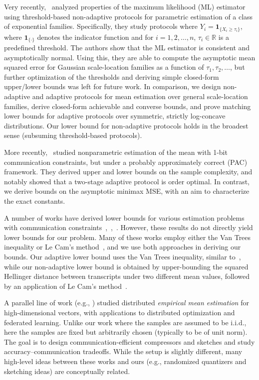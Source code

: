 \documentclass[10pt]{article} %
\newcommand{\iid}{\text{i.i.d.}}
\theoremstyle{plain}
\theoremstyle{definition}
\theoremstyle{remark}
\newcommand{\bR}{\mathbb R}
\begin{document}
Very recently,~\citep{shah2025generalized} analyzed properties of the maximum likelihood (ML) estimator using threshold-based non-adaptive protocols for parametric estimation of a class of exponential families.  Specifically, they study protocols where $Y_i=\boldsymbol{1}_{\{X_i\geq \tau_i\}}$, where $\boldsymbol{1}_{\{\cdot\}}$ denotes the indicator function and for $i=1,2,\ldots,n$, $\tau_i\in\bR$ is a predefined threshold. The authors show that the ML estimator is consistent and asymptotically normal. Using this, they are able to compute the asymptotic mean squared error for Gaussian scale-location families as a function of $\tau_1,\tau_2,\ldots$, but further optimization of the thresholds and deriving simple closed-form upper/lower bounds was left for future work. In comparison, we design non-adaptive and adaptive protocols for mean estimation over general scale-location families, derive closed-form achievable and converse bounds, and prove matching lower bounds for adaptive protocols over symmetric, strictly log-concave distributions. Our lower bound for non-adaptive protocols holds in the broadest sense (subsuming threshold-based protocols).


More recently,~\citep{lau2025sequential1bitmeanestimation} studied nonparametric estimation of the mean with 1-bit communication constraints, but under a probably approximately correct (PAC) framework. They derived upper and lower bounds on the sample complexity, and notably showed that a two-stage adaptive protocol is order optimal.  
In contrast, we derive bounds on the asymptotic minimax MSE, with an aim to characterize the exact constants.

A number of works have derived lower bounds for various estimation problems with communication constraints~\citep{han2021geometric,zhang2012communication},~\citep{zhang2013information},~\citep{barnes2019fisher,barnes2020lower}.  However, these results do not directly yield lower bounds for our problem. Many of these works employ either the Van Trees inequality or Le Cam's method~\citep{van2004detection, bj/1186078362,le2012asymptotic,polyanskiy2024information}, and we use both approaches in deriving our bounds. Our adaptive lower bound uses the Van Trees inequality, similar to~\citep{kipnis2022mean}, while our non-adaptive lower bound is obtained by upper-bounding the squared Hellinger distance between transcripts under two different mean values, followed by an application of Le Cam's method~\citep{lecam1973convergence,polyanskiy2024information}. 

A parallel line of work (e.g.,  \citep{Konecny2018RDME,Mayekar2021WynerZiv,BenBasat2024QuickDME,Babu2025L1Unbiased}) studied distributed \emph{empirical mean estimation} for high-dimensional vectors, with applications to distributed optimization and federated learning. Unlike our work where the samples are assumed to be $\iid$, here the samples are fixed but arbitrarily chosen (typically to be of unit norm). The goal is to design communication-efficient compressors and sketches and study accuracy–communication tradeoffs. While the setup is slightly different, many high-level ideas between these works and ours (e.g., randomized quantizers and sketching ideas) are conceptually related.
\end{document}
